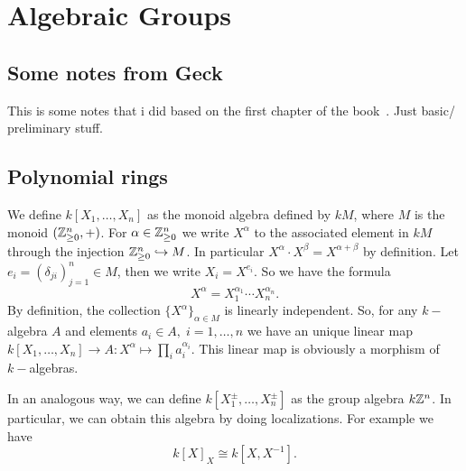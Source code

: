 \chapter{Algebraic Groups}
\section{Some notes from Geck}
This is some notes that i did based on the first chapter of the book~\cite{geck2013introduction}. Just 
basic/ preliminary stuff.
\section{Polynomial rings}
We define $k[X_1,\dots,X_n]$ as the monoid algebra defined by $kM$, where $M$ is the monoid $(\mathbb{Z}^n_{\geq0},+)$.
For $\alpha\in \mathbb{Z}_{\geq0}^n$ we write $X^\alpha$ to the associated element in $kM$ through the injection 
$\mathbb{Z}_{\geq0}^n\hookrightarrow M$. In particular $X^\alpha \cdot X^\beta = X^{\alpha + \beta}$ by definition. 
Let $e_i=(\delta_{ji})_{j=1}^n\in M$, then we write $X_i = X^{e_i}$. So we have the formula 
\begin{equation}
    X^\alpha = X_1^{\alpha_1}\cdots X_n^{\alpha_n}.
\end{equation}
By definition, the collection $\{X^\alpha\}_{\alpha\in M}$ is linearly independent. So, for any $k-$algebra $A$ and elements 
$a_i\in A,\;i=1,\dots,n$ we have an unique linear map $k[X_1,\dots,X_n]\to A: X^\alpha \mapsto \prod_i a_i^{\alpha_i}$. This linear 
map is obviously a morphism of $k-$algebras. \par

In an analogous way, we can define $k[X_1^\pm,\dots, X_n^\pm]$ as the group algebra $k\mathbb{Z}^n$. In particular, 
we can obtain this algebra by doing localizations. For example we have 
\begin{equation}
    k[X]_X \cong k[X,X^{-1}].
\end{equation}

